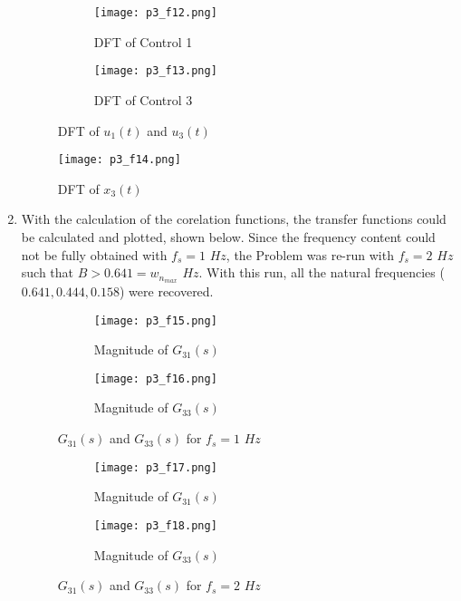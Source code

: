 \documentclass{article}
\begin{document}
\begin{enumerate}
    \begin{figure}[h]
    \centering
    \begin{subfigure}{.5\textwidth}
      \centering
      \texttt{[image: p3\_f12.png]}
      \caption{DFT of Control 1}
      \label{fig:sub1}
    \end{subfigure}%
    \begin{subfigure}{.5\textwidth}
      \centering
      \texttt{[image: p3\_f13.png]}
      \caption{DFT of Control 3}
      \label{fig:sub2}
    \end{subfigure}
    \caption{DFT of $u_1(t)$ and $u_3(t)$}
    \label{fig:test}
    \end{figure}

    \begin{figure}[h]
        \centering
        \texttt{[image: p3\_f14.png]}
        \caption{DFT of $x_3(t)$}
        \label{fig:enter-label}
    \end{figure}
    \newpage

    \item With the calculation of the corelation functions, the transfer functions could be calculated and plotted, shown below. Since the frequency content could not be fully obtained with $f_s = 1$ $Hz$, the Problem was re-run with $f_s=2$ $Hz$ such that $B > 0.641 = w_{n_{max}}$ $ Hz$. With this run, all the natural frequencies ($0.641, 0.444, 0.158$) were recovered.

    \begin{figure}[h]
    \centering
    \begin{subfigure}{.5\textwidth}
      \centering
      \texttt{[image: p3\_f15.png]}
      \caption{Magnitude of $G_{31}(s)$}
      \label{fig:sub1}
    \end{subfigure}%
    \begin{subfigure}{.5\textwidth}
      \centering
      \texttt{[image: p3\_f16.png]}
      \caption{Magnitude of $G_{33}(s)$}
      \label{fig:sub2}
    \end{subfigure}
    \caption{$G_{31}(s)$ and $G_{33}(s)$ for $f_s=1$ $Hz$}
    \label{fig:test}
    \end{figure}

    \begin{figure}[h]
    \centering
    \begin{subfigure}{.5\textwidth}
      \centering
      \texttt{[image: p3\_f17.png]}
      \caption{Magnitude of $G_{31}(s)$}
      \label{fig:sub1}
    \end{subfigure}%
    \begin{subfigure}{.5\textwidth}
      \centering
      \texttt{[image: p3\_f18.png]}
      \caption{Magnitude of $G_{33}(s)$}
      \label{fig:sub2}
    \end{subfigure}
    \caption{$G_{31}(s)$ and $G_{33}(s)$ for $f_s=2$ $Hz$}
    \label{fig:test}
    \end{figure}
\end{enumerate}
\newpage
\end{document}
